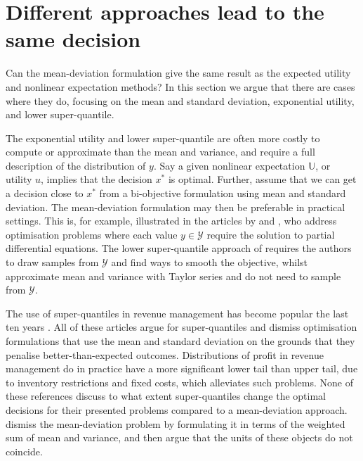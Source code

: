 \documentclass[main.tex]{subfiles}
\begin{document}
\section{Different approaches lead to the same decision}\label{sec:one_comparison_orderings}
Can the mean-deviation formulation give the
same result as the expected utility and nonlinear expectation methods?
In this section we argue that there are cases where they do,
focusing on the mean and standard deviation, exponential
utility, and lower super-quantile.

The exponential utility and lower super-quantile are often more costly
to compute or approximate than the mean and variance, and require a
full description of the distribution of $y$.
Say a given nonlinear expectation $\mathbb{U}$, or utility $u$,
implies that the decision $x^*$ is optimal. Further, assume that we can get a
decision close to $x^*$ from a bi-objective formulation using mean and standard
deviation. The mean-deviation formulation may then be preferable in
practical settings.
This is, for example, illustrated in the articles by
\citet{kouri2016risk} and \citet{alexanderian2017mean}, who address optimisation problems
where each value $y\in\mathcal{Y}$ require the solution to partial
differential equations.
The lower super-quantile approach of \citet{kouri2016risk}
requires the authors to draw samples from $\mathcal{Y}$ and find ways
to smooth the objective,
whilst \citet{alexanderian2017mean} approximate mean and variance
with Taylor series and do not need to sample from $\mathcal{Y}$.


The use of super-quantiles in revenue management has become popular
the last ten years
\citep{wu2014risk,xue2015optimal,zhou2008optimal,ahmed2007coherent}.
All of these articles argue for super-quantiles and dismiss
optimisation formulations that use the mean and standard deviation
on the grounds that they penalise better-than-expected outcomes.
Distributions of profit in revenue management do in practice
have a more significant lower tail than upper tail, due to inventory
restrictions and fixed costs, which alleviates such problems.
None of these references discuss to what extent super-quantiles change the
optimal decisions for their presented problems compared to a
mean-deviation approach. \citet{choi2011multiproduct}
dismiss the mean-deviation problem by formulating it in terms of the weighted sum of mean and
variance, and then argue that the units of these objects do not
coincide.
\end{document}
